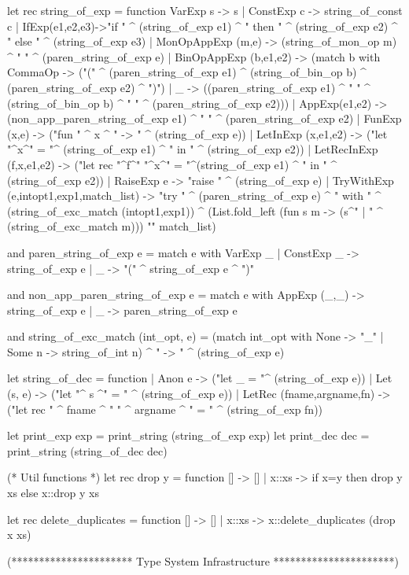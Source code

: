 let rec string_of_exp = function
   VarExp s -> s
 | ConstExp c ->  string_of_const c
 | IfExp(e1,e2,e3)->"if " ^ (string_of_exp e1) ^
                 " then " ^ (string_of_exp e2) ^
                 " else " ^ (string_of_exp e3)
 | MonOpAppExp (m,e) ->  (string_of_mon_op m) ^ " " ^ (paren_string_of_exp e) 
 | BinOpAppExp (b,e1,e2) -> 
   (match b with CommaOp -> ("(" ^ (paren_string_of_exp e1) ^ (string_of_bin_op b) ^
                              (paren_string_of_exp e2) ^ ")")
    | _ -> ((paren_string_of_exp e1) ^ " " ^ (string_of_bin_op b)
            ^ " " ^ (paren_string_of_exp e2)))
 | AppExp(e1,e2) -> (non_app_paren_string_of_exp e1) ^ " " ^ (paren_string_of_exp e2) 
 | FunExp (x,e) ->  ("fun " ^ x ^ " -> " ^ (string_of_exp e))
 | LetInExp (x,e1,e2) -> ("let "^x^" = "^ (string_of_exp e1) ^ " in " ^ (string_of_exp e2))
 | LetRecInExp (f,x,e1,e2) -> 
    ("let rec "^f^" "^x^" = "^(string_of_exp e1) ^ " in " ^ (string_of_exp e2))
 | RaiseExp e -> "raise " ^ (string_of_exp e)
 | TryWithExp (e,intopt1,exp1,match_list) ->
    "try " ^ (paren_string_of_exp e) ^  " with " ^
     (string_of_exc_match (intopt1,exp1)) ^
     (List.fold_left (fun s m -> (s^" | " ^ (string_of_exc_match m))) "" match_list) 

and paren_string_of_exp e =
    match e with VarExp _ | ConstExp _ -> string_of_exp e
    | _ -> "(" ^ string_of_exp e ^ ")"

and non_app_paren_string_of_exp e =
    match e with AppExp (_,_) -> string_of_exp e
    | _ -> paren_string_of_exp e
 

and string_of_exc_match (int_opt, e) =
    (match int_opt with None -> "_" | Some n -> string_of_int n) ^
    " -> " ^
    (string_of_exp e)
							
let string_of_dec = function
 | Anon e -> ("let _ = "^ (string_of_exp e))
 | Let (s, e) ->  ("let "^ s ^" = " ^ (string_of_exp e))
 | LetRec (fname,argname,fn) -> 
    ("let rec " ^ fname ^ " " ^ argname ^ " = " ^ (string_of_exp fn))

let print_exp exp = print_string (string_of_exp exp) 
let print_dec dec = print_string (string_of_dec dec)

(* Util functions *)
let rec drop y = function
   []    -> []
 | x::xs -> if x=y then drop y xs else x::drop y xs

let rec delete_duplicates = function
   []    -> []
 | x::xs -> x::delete_duplicates (drop x xs)

(********************** Type System Infrastructure **********************)

